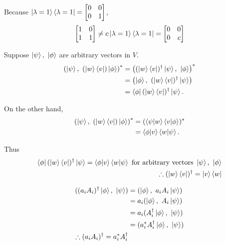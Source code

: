 Because $\ket{\lambda = 1}\bra{\lambda = 1} = \begin{bmatrix}
0 & 0 \\
0 & 1
\end{bmatrix}$,
\begin{align*}
	\begin{bmatrix}
	1 & 0 \\
	1 & 1
	\end{bmatrix} \neq c\ket{\lambda = 1}\bra{\lambda = 1} = \begin{bmatrix}
	0 & 0 \\
	0 & c
	\end{bmatrix}
\end{align*}




Suppose $\ket{\psi},\ \ket{\phi}$ are arbitrary vectors in $V$.
\begin{align*}
	\left(\ket{\psi},\ (\ket{w}\bra{v}) \ket{\phi}\right)^* &=
	\left((\ket{w}\bra{v})^\dagger \ket{\psi},\  \ket{\phi}\right)^*\\
	&= \left(\ket{\phi},\ (\ket{w}\bra{v})^\dagger \ket{\psi} \right)\\
	&= \bra{\phi} (\ket{w}\bra{v})^\dagger \ket{\psi}.
\end{align*}

On the other hand,
\begin{align*}
	\left(\ket{\psi},\ (\ket{w}\bra{v}) \ket{\phi}\right)^*
	&= (\braket{\psi | w} \braket{v | \phi})^*\\
	&= \braket{\phi | v} \braket{w | \psi}.
\end{align*}

Thus
\begin{align*}
	\bra{\phi} (\ket{w}\bra{v})^\dagger \ket{\psi} = \braket{\phi | v} \braket{w | \psi} \text{ for arbitrary vectors } \ket{\psi},\ \ket{\phi}\\
	\therefore (\ket{w}\bra{v})^\dagger = \ket{v}\bra{w}
\end{align*}


\begin{align*}
	( (a_i A_i)^\dagger \ket{\phi},\ \ket{\psi} )
	&= (\ket{\phi},\ a_i A_i \ket{\psi})\\
	&= a_i (\ket{\phi},\ A_i \ket{\psi})\\
	&= a_i (A_i^\dagger \ket{\phi},\ \ket{\psi})\\
	&= (a_i^* A_i^\dagger \ket{\phi},\ \ket{\psi})\\
%
	\therefore (a_i A_i)^\dagger = a_i^* A_i^\dagger
\end{align*}




